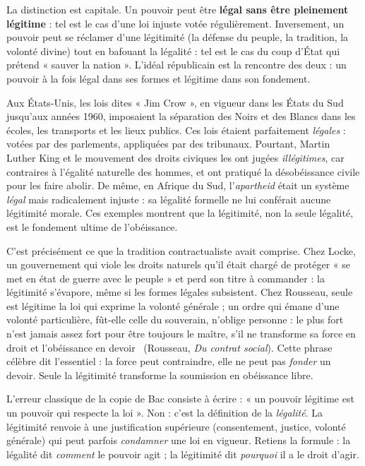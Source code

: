 \documentclass[11pt]{article}
\begin{document}
La distinction est capitale. Un pouvoir peut être \textbf{légal sans être pleinement légitime} : tel est le cas d'une loi injuste votée régulièrement. Inversement, un pouvoir peut se réclamer d'une légitimité (la défense du peuple, la tradition, la volonté divine) tout en bafouant la légalité : tel est le cas du coup d'État qui prétend « sauver la nation ». L'idéal républicain est la rencontre des deux : un pouvoir à la fois légal dans ses formes et légitime dans son fondement.

\begin{exemplebox}
Aux États-Unis, les lois dites « Jim Crow », en vigueur dans les États du Sud jusqu'aux années 1960, imposaient la séparation des Noirs et des Blancs dans les écoles, les transports et les lieux publics. Ces lois étaient parfaitement \emph{légales} : votées par des parlements, appliquées par des tribunaux. Pourtant, Martin Luther King et le mouvement des droits civiques les ont jugées \emph{illégitimes}, car contraires à l'égalité naturelle des hommes, et ont pratiqué la désobéissance civile pour les faire abolir. De même, en Afrique du Sud, l'\emph{apartheid} était un système \emph{légal} mais radicalement injuste : sa légalité formelle ne lui conférait aucune légitimité morale. Ces exemples montrent que la légitimité, non la seule légalité, est le fondement ultime de l'obéissance.
\end{exemplebox}

C'est précisément ce que la tradition contractualiste avait comprise. Chez Locke, un gouvernement qui viole les droits naturels qu'il était chargé de protéger « se met en état de guerre avec le peuple » et perd son titre à commander : la légitimité s'évapore, même si les formes légales subsistent. Chez Rousseau, seule est légitime la loi qui exprime la volonté générale ; un ordre qui émane d'une volonté particulière, fût-elle celle du souverain, n'oblige personne : \guillemotleft le plus fort n'est jamais assez fort pour être toujours le maître, s'il ne transforme sa force en droit et l'obéissance en devoir \guillemotright\ (Rousseau, \emph{Du contrat social}). Cette phrase célèbre dit l'essentiel : la force peut contraindre, elle ne peut pas \emph{fonder} un devoir. Seule la légitimité transforme la soumission en obéissance libre.

\begin{attention}
L'erreur classique de la copie de Bac consiste à écrire : « un pouvoir légitime est un pouvoir qui respecte la loi ». Non : c'est la définition de la \emph{légalité}. La légitimité renvoie à une justification supérieure (consentement, justice, volonté générale) qui peut parfois \emph{condamner} une loi en vigueur. Retiens la formule : la légalité dit \emph{comment} le pouvoir agit ; la légitimité dit \emph{pourquoi} il a le droit d'agir.
\end{attention}
\end{document}
